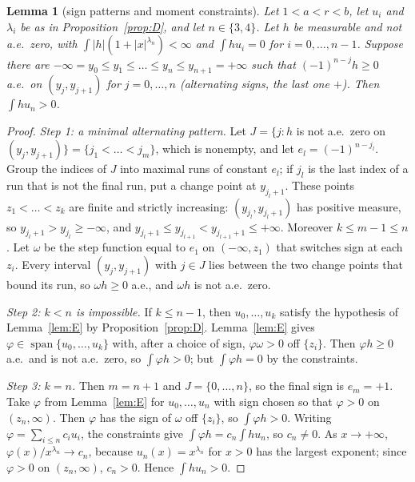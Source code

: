 \documentclass[11pt]{article}
\newtheorem{lemmaL}{Lemma}
\theoremstyle{remark}
\begin{document}
\begin{lemmaL}[sign patterns and moment constraints]\label{lem:F}
Let $1<a<r<b$, let $u_i$ and $\lambda_i$ be as in Proposition~\ref{prop:D}, and let $n\in\{3,4\}$. Let $h$ be measurable and not a.e.\ zero, with $\int|h|(1+|x|^{\lambda_n})<\infty$ and $\int hu_i=0$ for $i=0,\dots,n-1$. Suppose there are $-\infty=y_0\le y_1\le\dots\le y_n\le y_{n+1}=+\infty$ such that $(-1)^{n-j}h\ge0$ a.e.\ on $(y_j,y_{j+1})$ for $j=0,\dots,n$ (alternating signs, the last one $+$). Then $\int hu_n>0$.
\end{lemmaL}
\begin{proof}
\emph{Step 1: a minimal alternating pattern.} Let $J=\{j:h$ is not a.e.\ zero on $(y_j,y_{j+1})\}=\{j_1<\dots<j_m\}$, which is nonempty, and let $e_l=(-1)^{n-j_l}$. Group the indices of $J$ into maximal runs of constant $e_l$; if $j_l$ is the last index of a run that is not the final run, put a change point at $y_{j_l+1}$. These points $z_1<\dots<z_k$ are finite and strictly increasing: $(y_{j_l},y_{j_l+1})$ has positive measure, so $y_{j_l+1}>y_{j_l}\ge-\infty$, and $y_{j_l+1}\le y_{j_{l+1}}<y_{j_{l+1}+1}\le+\infty$. Moreover $k\le m-1\le n$. Let $\omega$ be the step function equal to $e_1$ on $(-\infty,z_1)$ that switches sign at each $z_i$. Every interval $(y_j,y_{j+1})$ with $j\in J$ lies between the two change points that bound its run, so $\omega h\ge0$ a.e., and $\omega h$ is not a.e.\ zero.

\emph{Step 2: $k<n$ is impossible.} If $k\le n-1$, then $u_0,\dots,u_k$ satisfy the hypothesis of Lemma~\ref{lem:E} by Proposition~\ref{prop:D}. Lemma~\ref{lem:E} gives $\varphi\in\operatorname{span}\{u_0,\dots,u_k\}$ with, after a choice of sign, $\varphi\omega>0$ off $\{z_i\}$. Then $\varphi h\ge0$ a.e.\ and is not a.e.\ zero, so $\int\varphi h>0$; but $\int\varphi h=0$ by the constraints.

\emph{Step 3: $k=n$.} Then $m=n+1$ and $J=\{0,\dots,n\}$, so the final sign is $e_m=+1$. Take $\varphi$ from Lemma~\ref{lem:E} for $u_0,\dots,u_n$ with sign chosen so that $\varphi>0$ on $(z_n,\infty)$. Then $\varphi$ has the sign of $\omega$ off $\{z_i\}$, so $\int\varphi h>0$. Writing $\varphi=\sum_{i\le n}c_iu_i$, the constraints give $\int\varphi h=c_n\int hu_n$, so $c_n\ne0$. As $x\to+\infty$, $\varphi(x)/x^{\lambda_n}\to c_n$, because $u_n(x)=x^{\lambda_n}$ for $x>0$ has the largest exponent; since $\varphi>0$ on $(z_n,\infty)$, $c_n>0$. Hence $\int hu_n>0$.
\end{proof}
\end{document}
